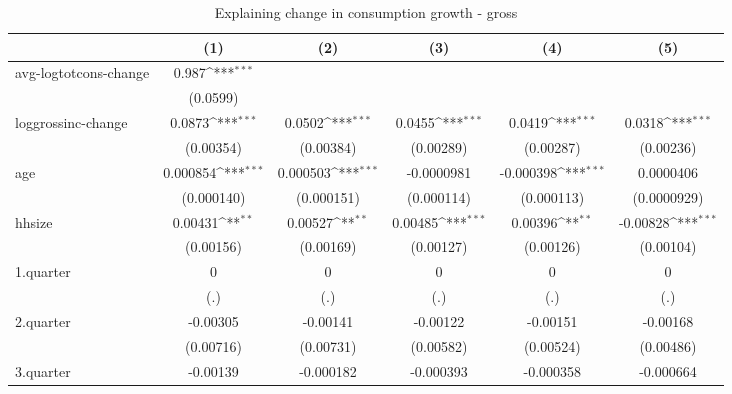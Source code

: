 \begin{table}[htbp]\centering
\def\sym#1{\ifmmode^{#1}\else\(^{#1}\)\fi}
\caption{\label{tab:log2.2B-deltacons-gross} Explaining change in consumption growth - gross}
\begin{tabular}{l*{5}{c}}
\hline\hline
            &\multicolumn{1}{c}{(1)}         &\multicolumn{1}{c}{(2)}         &\multicolumn{1}{c}{(3)}         &\multicolumn{1}{c}{(4)}         &\multicolumn{1}{c}{(5)}         \\
\hline
avg-logtotcons-change&       0.987\sym{***}&                     &                     &                     &                     \\
            &    (0.0599)         &                     &                     &                     &                     \\
loggrossinc-change&      0.0873\sym{***}&      0.0502\sym{***}&      0.0455\sym{***}&      0.0419\sym{***}&      0.0318\sym{***}\\
            &   (0.00354)         &   (0.00384)         &   (0.00289)         &   (0.00287)         &   (0.00236)         \\
age         &    0.000854\sym{***}&    0.000503\sym{***}&  -0.0000981         &   -0.000398\sym{***}&   0.0000406         \\
            &  (0.000140)         &  (0.000151)         &  (0.000114)         &  (0.000113)         & (0.0000929)         \\
hhsize      &     0.00431\sym{**} &     0.00527\sym{**} &     0.00485\sym{***}&     0.00396\sym{**} &    -0.00828\sym{***}\\
            &   (0.00156)         &   (0.00169)         &   (0.00127)         &   (0.00126)         &   (0.00104)         \\
1.quarter   &           0         &           0         &           0         &           0         &           0         \\
            &         (.)         &         (.)         &         (.)         &         (.)         &         (.)         \\
2.quarter   &    -0.00305         &    -0.00141         &    -0.00122         &    -0.00151         &    -0.00168         \\
            &   (0.00716)         &   (0.00731)         &   (0.00582)         &   (0.00524)         &   (0.00486)         \\
3.quarter   &    -0.00139         &   -0.000182         &   -0.000393         &   -0.000358         &   -0.000664         \\

\end{tabular}
\end{table}
